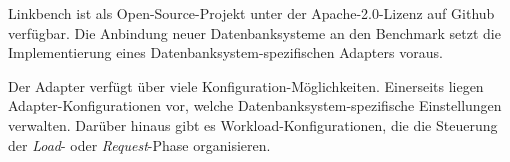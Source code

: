 Linkbench ist als Open-Source-Projekt unter der Apache-2.0-Lizenz auf Github verfügbar. Die Anbindung neuer Datenbanksysteme an den Benchmark setzt die Implementierung eines Datenbanksystem-spezifischen Adapters voraus. 

Der Adapter verfügt über viele Konfiguration-Möglichkeiten. Einerseits liegen Adapter-Konfigurationen vor, welche Datenbanksystem-spezifische Einstellungen verwalten. Darüber hinaus gibt es Workload-Konfigurationen, die die Steuerung der \textit{Load}- oder \textit{Request}-Phase organisieren. 